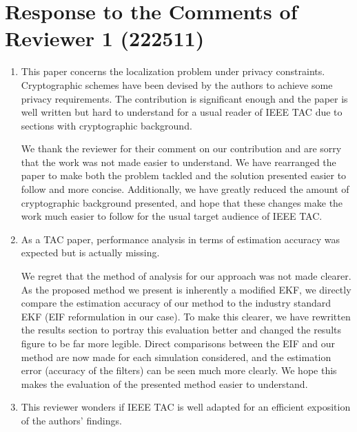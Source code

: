 \documentclass[a4paper]{scrartcl}
\newenvironment{rebuttal}{\begin{enumerate}[label={\color{grey}\thesection.\arabic{enumi}},leftmargin=0pt,ref=\thesection.\arabic{enumi}]}{\end{enumerate}}
\newcommand{\reviewtext}[1]{{\color{nblue} #1}}
\begin{document}



\section*{Response to the Comments of Reviewer 1 (222511)}
\def\thesection{R1}
\begin{rebuttal}
\item \reviewtext{This paper concerns the localization problem under privacy constraints. Cryptographic schemes have been devised by the authors to achieve some privacy requirements. The contribution is significant enough and the paper is well written but hard to understand for a usual reader of IEEE TAC due to sections with cryptographic background.}

We thank the reviewer for their comment on our contribution and are sorry that the work was not made easier to understand. We have rearranged the paper to make both the problem tackled and the solution presented easier to follow and more concise. Additionally, we have greatly reduced the amount of cryptographic background presented, and hope that these changes make the work much easier to follow for the usual target audience of IEEE TAC. 

\item \reviewtext{As a TAC paper, performance analysis in terms of estimation accuracy was expected but is actually missing.}

We regret that the method of analysis for our approach was not made clearer. As the proposed method we present is inherently a modified EKF, we directly compare the estimation accuracy of our method to the industry standard EKF (EIF reformulation in our case). To make this clearer, we have rewritten the results section to portray this evaluation better and changed the results figure to be far more legible. Direct comparisons between the EIF and our method are now made for each simulation considered, and the estimation error (accuracy of the filters) can be seen much more clearly. We hope this makes the evaluation of the presented method easier to understand.

\item \reviewtext{This reviewer wonders if IEEE TAC is well adapted for an efficient exposition of the authors' findings.}


\end{rebuttal}
\end{document}
